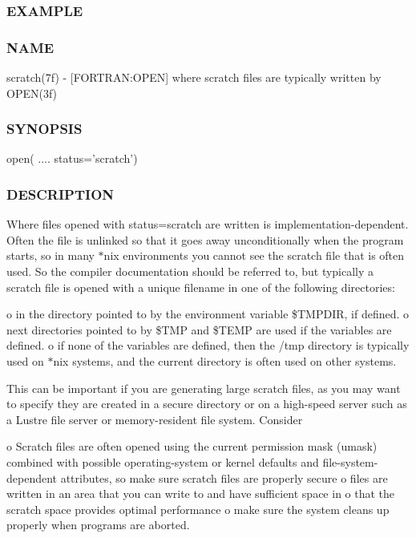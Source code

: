  \subsubsection*{E\+X\+A\+M\+P\+LE}

\subsubsection*{N\+A\+ME}

scratch(7f) -\/ \mbox{[}F\+O\+R\+T\+R\+AN\+:O\+P\+EN\mbox{]} where scratch files are typically written by O\+P\+E\+N(3f) \subsubsection*{S\+Y\+N\+O\+P\+S\+IS}

\begin{DoxyVerb} open( .... status='scratch')
\end{DoxyVerb}
 \subsubsection*{D\+E\+S\+C\+R\+I\+P\+T\+I\+ON}

Where files opened with status=\textquotesingle{}scratch\textquotesingle{} are written is implementation-\/dependent. Often the file is unlinked so that it goes away unconditionally when the program starts, so in many $\ast$nix environments you cannot see the scratch file that is often used. So the compiler documentation should be referred to, but typically a scratch file is opened with a unique filename in one of the following directories\+:

o in the directory pointed to by the environment variable \$\+T\+M\+P\+D\+IR, if defined. o next directories pointed to by \$\+T\+MP and \$\+T\+E\+MP are used if the variables are defined. o if none of the variables are defined, then the /tmp directory is typically used on $\ast$nix systems, and the current directory is often used on other systems.

This can be important if you are generating large scratch files, as you may want to specify they are created in a secure directory or on a high-\/speed server such as a Lustre file server or memory-\/resident file system. Consider

o Scratch files are often opened using the current permission mask (umask) combined with possible operating-\/system or kernel defaults and file-\/system-\/dependent attributes, so make sure scratch files are properly secure o files are written in an area that you can write to and have sufficient space in o that the scratch space provides optimal performance o make sure the system cleans up properly when programs are aborted.

